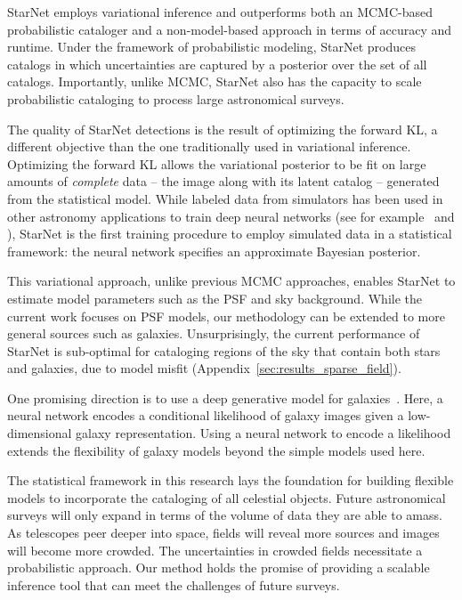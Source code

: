 StarNet employs variational inference and outperforms both an MCMC-based probabilistic cataloger and a non-model-based approach in terms of accuracy and runtime. 
Under the framework of probabilistic modeling, 
StarNet produces catalogs in which uncertainties are captured by a posterior over the set of all catalogs.
Importantly, unlike MCMC, StarNet also has the capacity to scale probabilistic cataloging to process large astronomical surveys. 

The quality of StarNet detections is the result of optimizing the forward KL, a different objective than the one traditionally used in variational inference. 
Optimizing the forward KL allows the variational posterior to be fit on large amounts of {\itshape complete} data -- the image along with its latent catalog -- generated from the statistical model. 
While labeled data from simulators has been used in other astronomy applications to train deep neural networks (see for example~\cite{Lanusse_2017_cmudeeplens} and \cite{huang2019finding}), StarNet is the first training procedure to employ simulated data in a statistical framework: the neural network specifies an approximate Bayesian posterior. 

This variational approach, unlike previous MCMC approaches, enables StarNet to estimate model parameters such as the PSF and sky background.
While the current work focuses on PSF models, our methodology can be extended to more general sources such as galaxies. 
Unsurprisingly, the current performance of StarNet is sub-optimal for cataloging regions of the sky that contain both stars and galaxies, due to model misfit (Appendix~\ref{sec:results_sparse_field}).  

One promising direction is to use a deep generative model for galaxies~\citep{Regier2015ADG, Reiman_2019_gans_deblend, lanusse2020deep, Arcelin_2020}. 
Here, a neural network encodes a conditional likelihood of galaxy images given a low-dimensional galaxy representation. 
Using a neural network to encode a likelihood extends the flexibility of galaxy models beyond the simple models used here. 


The statistical framework in this research lays the foundation for building flexible models to incorporate the cataloging of all celestial objects. 
Future astronomical surveys will only expand in terms of the volume of data they are able to amass. 
As telescopes peer deeper into space, fields will reveal more sources and images will become more crowded. 
The uncertainties in crowded fields necessitate a probabilistic approach. 
Our method holds the promise of providing  a scalable inference tool that can meet the challenges of future surveys. 


